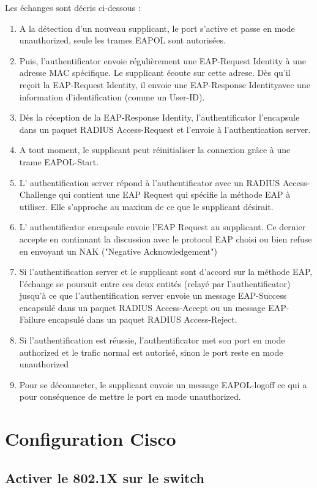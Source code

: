 Les échanges sont décris ci-dessous :\\
\begin{enumerate}
\item A la détection d'un nouveau supplicant, le port s'active et passe en mode unauthorized, seule les trames EAPOL sont autorisées.
\item Puis, l'authentificator envoie régulièrement une EAP-Request Identity à une adresse MAC spécifique. Le supplicant écoute sur cette adrese. Dès qu'il reçoit la EAP-Request Identity, il envoie une EAP-Response Identityavec une information d'identification (comme un User-ID).
\item Dès la réception de la EAP-Response Identity, l'authentificator l'encapsule dans un paquet RADIUS Access-Request et l'envoie à l'authentication server.
\item A tout moment, le supplicant peut réinitialiser la connexion grâce à une trame EAPOL-Start.
\item L' authentification server répond à l'authentificator avec un RADIUS Access-Challenge qui contient une EAP Request qui spécifie la méthode EAP à utiliser. Elle s'approche au maxium de ce que le supplicant désirait.
\item L' authentificator encapsule envoie l'EAP Request au supplicant. Ce dernier accepte en continuant la discussion avec le protocol EAP choisi ou bien refuse en envoyant un NAK ("Negative Acknowledgement") 
\item Si l'authentification server et le supplicant sont d'accord sur la méthode EAP, l'échange se poursuit entre ces deux entités (relayé par l'authentificator) jusqu'à ce que l'authentification server envoie un message  EAP-Success encapsulé dans un paquet RADIUS Access-Accept ou un message  EAP-Failure encapsulé dans un paquet  RADIUS Access-Reject.
\item Si l'authentification est réussie, l'authentificator met son port en mode authorized et le trafic normal est autorisé, sinon le port reste en mode unauthorized
\item Pour se déconnecter, le supplicant envoie un message EAPOL-logoff ce qui a pour conséquence de mettre le port en mode unauthorized.
\end{enumerate}

\newpage
\section{Configuration Cisco}

\subsection{Activer le 802.1X sur le switch}

